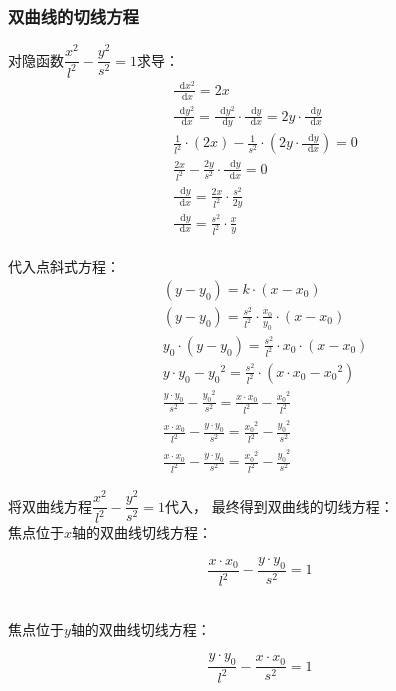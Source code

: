 \documentclass[UTF8]{ctexart}
\newcommand*{\dif}{\mathop{}\!\mathrm{d}}
\begin{document}
\subsubsection{双曲线的切线方程}
    对隐函数$\dfrac{x^2}{l^2}-\dfrac{y^2}{s^2}=1$求导：
    \setcounter{equation}{0}
    \begin{align}
        &\frac{\dif x^2}{\dif x}=2x\\[4mm]
        &\frac{\dif y^2}{\dif x}=\frac{\dif y^2}{\dif y}\cdot\frac{\dif y}{\dif x}=2y\cdot\frac{\dif y}{\dif x}\\[6mm]
        &\frac{1}{l^2}\cdot(2x)-\frac{1}{s^2}\cdot(2y\cdot\frac{\dif y}{\dif x})=0\\[5mm]
        &\frac{2x}{l^2}-\frac{2y}{s^2}\cdot\frac{\dif y}{\dif x}=0\\[4mm]
        &\frac{\dif y}{\dif x}=\frac{2x}{l^2}\cdot\frac{s^2}{2y}\\[4mm]
        &\frac{\dif y}{\dif x}=\frac{s^2}{l^2}\cdot\frac{x}{y}
    \end{align}\\
    代入点斜式方程：
    \begin{align}
        &(y-y_0)=k\cdot(x-x_0)\\[4mm]
        &(y-y_0)=\frac{s^2}{l^2}\cdot\frac{x_0}{y_0}\cdot(x-x_0)\\[4mm]
        &y_0\cdot(y-y_0)=\frac{s^2}{l^2}\cdot x_0\cdot(x-x_0)\\[4mm]
        &y\cdot y_0-{y_0}^2=\frac{s^2}{l^2}\cdot(x\cdot x_0-{x_0}^2)\\[4mm]
        &\frac{y\cdot y_0}{s^2}-\frac{{y_0}^2}{s^2}=\frac{x\cdot x_0}{l^2}-\frac{{x_0}^2}{l^2}\\[6mm]
        &\frac{x\cdot x_0}{l^2}-\frac{y\cdot y_0}{s^2}=\frac{{x_0}^2}{l^2}-\frac{{y_0}^2}{s^2}\\[6mm]
        &\frac{x\cdot x_0}{l^2}-\frac{y\cdot y_0}{s^2}=\frac{{x_0}^2}{l^2}-\frac{{y_0}^2}{s^2}
    \end{align}

\newpage

    将双曲线方程$\dfrac{x^2}{l^2}-\dfrac{y^2}{s^2}=1$代入，
    最终得到双曲线的切线方程：\\[4mm]
    焦点位于$x$轴的双曲线切线方程：
    \begin{large}
        \begin{equation*}
            \frac{x \cdot x_0}{l^2}-\frac{y \cdot y_0}{s^2}=1
        \end{equation*}
    \end{large}\\
    焦点位于$y$轴的双曲线切线方程：
    \begin{large}
        \begin{equation*}
            \frac{y \cdot y_0}{l^2}-\frac{x \cdot x_0}{s^2}=1
        \end{equation*}
    \end{large}\\
\end{document}
